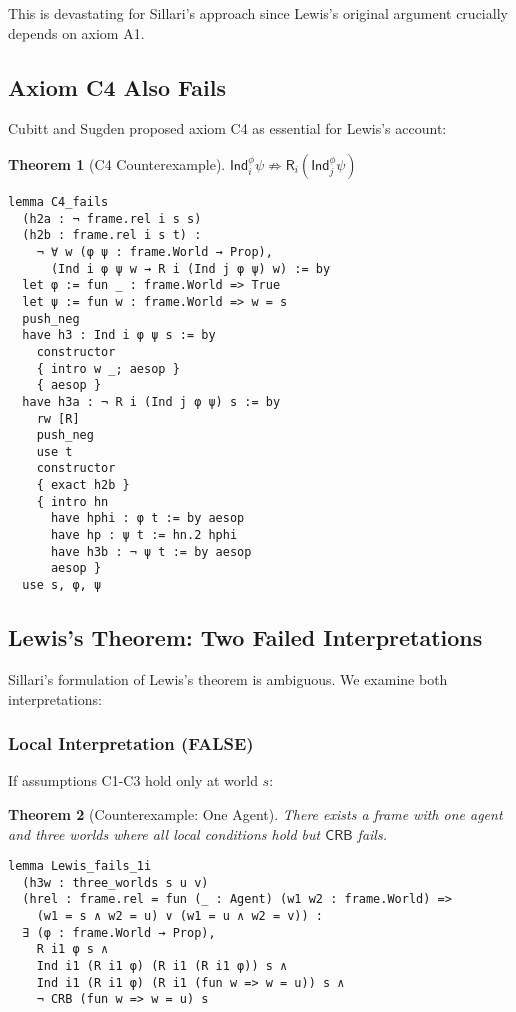 \documentclass[11pt]{article}
\newtheorem{theorem}{Theorem}
\newcommand{\Roperator}{\mathsf{R}}
\newcommand{\Ind}{\mathsf{Ind}}
\newcommand{\CRB}{\mathsf{CRB}}
\begin{document}
This is devastating for Sillari's approach since Lewis's original argument 
crucially depends on axiom A1.

\subsection{Axiom C4 Also Fails}

Cubitt and Sugden proposed axiom C4 as essential for Lewis's account:

\begin{theorem}[C4 Counterexample]
$\Ind_i^\phi \psi \not\Rightarrow \Roperator_i(\Ind_j^\phi \psi)$
\end{theorem}

\begin{verbatim}
lemma C4_fails
  (h2a : ¬ frame.rel i s s)
  (h2b : frame.rel i s t) :
    ¬ ∀ w (φ ψ : frame.World → Prop), 
      (Ind i φ ψ w → R i (Ind j φ ψ) w) := by
  let φ := fun _ : frame.World => True
  let ψ := fun w : frame.World => w = s
  push_neg
  have h3 : Ind i φ ψ s := by
    constructor
    { intro w _; aesop }
    { aesop }
  have h3a : ¬ R i (Ind j φ ψ) s := by
    rw [R]
    push_neg
    use t
    constructor
    { exact h2b }
    { intro hn
      have hphi : φ t := by aesop
      have hp : ψ t := hn.2 hphi
      have h3b : ¬ ψ t := by aesop
      aesop }
  use s, φ, ψ
\end{verbatim}

\subsection{Lewis's Theorem: Two Failed Interpretations}

Sillari's formulation of Lewis's theorem is ambiguous. We examine both 
interpretations:

\subsubsection{Local Interpretation (FALSE)}

If assumptions C1-C3 hold only at world $s$:

\begin{theorem}[Counterexample: One Agent]
There exists a frame with one agent and three worlds where all local conditions 
hold but $\CRB$ fails.
\end{theorem}

\begin{verbatim}
lemma Lewis_fails_1i
  (h3w : three_worlds s u v)
  (hrel : frame.rel = fun (_ : Agent) (w1 w2 : frame.World) =>
    (w1 = s ∧ w2 = u) ∨ (w1 = u ∧ w2 = v)) :
  ∃ (φ : frame.World → Prop),
    R i1 φ s ∧
    Ind i1 (R i1 φ) (R i1 (R i1 φ)) s ∧  
    Ind i1 (R i1 φ) (R i1 (fun w => w = u)) s ∧
    ¬ CRB (fun w => w = u) s
\end{verbatim}
\end{document}
